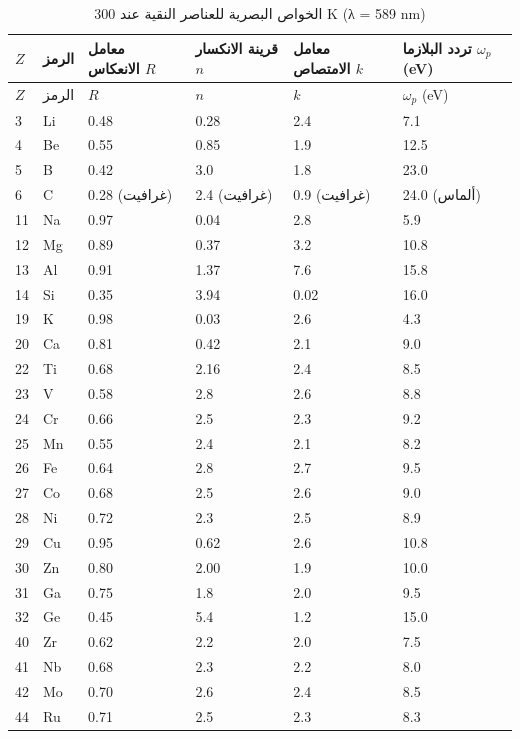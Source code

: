\documentclass[11pt,a4paper]{article}
\begin{document}
\begin{otherlanguage}{arabic}
		\begin{longtable}{p{0.8cm}p{1.2cm}p{2.2cm}p{2.2cm}p{2.2cm}p{2.2cm}}
			\caption{الخواص البصرية للعناصر النقية عند 300 K (λ = 589 nm)} \label{tab:optical-properties-func} \\
			\toprule
			\(Z\) & الرمز & معامل الانعكاس \(R\) & قرينة الانكسار \(n\) & معامل الامتصاص \(k\) & تردد البلازما \(\omega_p\) (eV) \\
			\midrule
			\endfirsthead
			\toprule
			\(Z\) & الرمز & \(R\) & \(n\) & \(k\) & \(\omega_p\) (eV) \\
			\midrule
			\endhead
			3  & Li & 0.48 & 0.28 & 2.4 & 7.1 \\
			4  & Be & 0.55 & 0.85 & 1.9 & 12.5 \\
			5  & B  & 0.42 & 3.0 & 1.8 & 23.0 \\
			6  & C  & 0.28 (غرافيت) & 2.4 (غرافيت) & 0.9 (غرافيت) & 24.0 (ألماس) \\
			11 & Na & 0.97 & 0.04 & 2.8 & 5.9 \\
			12 & Mg & 0.89 & 0.37 & 3.2 & 10.8 \\
			13 & Al & 0.91 & 1.37 & 7.6 & 15.8 \\
			14 & Si & 0.35 & 3.94 & 0.02 & 16.0 \\
			19 & K  & 0.98 & 0.03 & 2.6 & 4.3 \\
			20 & Ca & 0.81 & 0.42 & 2.1 & 9.0 \\
			22 & Ti & 0.68 & 2.16 & 2.4 & 8.5 \\
			23 & V  & 0.58 & 2.8 & 2.6 & 8.8 \\
			24 & Cr & 0.66 & 2.5 & 2.3 & 9.2 \\
			25 & Mn & 0.55 & 2.4 & 2.1 & 8.2 \\
			26 & Fe & 0.64 & 2.8 & 2.7 & 9.5 \\
			27 & Co & 0.68 & 2.5 & 2.6 & 9.0 \\
			28 & Ni & 0.72 & 2.3 & 2.5 & 8.9 \\
			29 & Cu & 0.95 & 0.62 & 2.6 & 10.8 \\
			30 & Zn & 0.80 & 2.00 & 1.9 & 10.0 \\
			31 & Ga & 0.75 & 1.8 & 2.0 & 9.5 \\
			32 & Ge & 0.45 & 5.4 & 1.2 & 15.0 \\
			40 & Zr & 0.62 & 2.2 & 2.0 & 7.5 \\
			41 & Nb & 0.68 & 2.3 & 2.2 & 8.0 \\
			42 & Mo & 0.70 & 2.6 & 2.4 & 8.5 \\
			44 & Ru & 0.71 & 2.5 & 2.3 & 8.3 \\

\end{longtable}
\end{otherlanguage}
\end{document}
